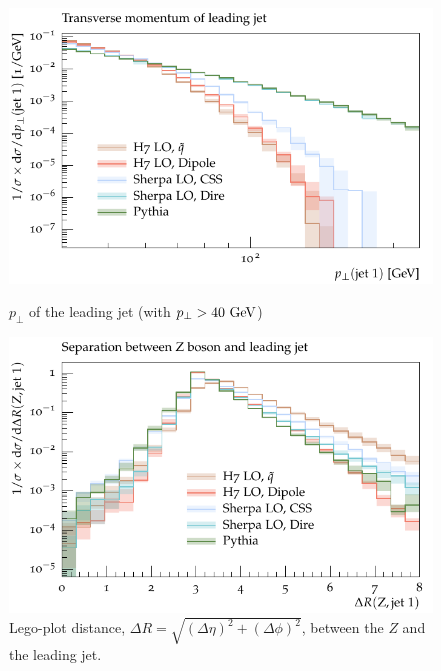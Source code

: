 \begin{figure}[h]
  \centering
  \begin{minipage}[t]{0.49\textwidth}
    \includegraphics[width=1\textwidth]{plots/Z-91-MuShower/LH_Z/jet1_pT.pdf}
    \caption{$p_\perp$ of the leading jet (with $p_\perp > 40~\textrm{GeV}$)}
    \label{fig:z:jet1_pt}
  \end{minipage}
  \begin{minipage}[t]{0.49\textwidth}
    \includegraphics[width=1\textwidth]{plots/Z-91-MuShower/LH_Z/X_jet1_dR.pdf}
    \caption{Lego-plot distance, $\Delta R = \sqrt{(\Delta\eta)^2 + (\Delta\phi)^2}$, between the $Z$ and the leading jet.}
    \label{fig:z:deltaR}
  \end{minipage}
\end{figure}

